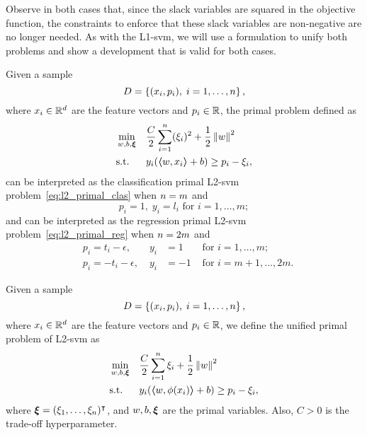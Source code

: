 %
Observe in both cases that, since the slack variables are squared in the objective function, the constraints to enforce that these slack variables are non-negative are no longer needed.
As with the L1-\acrshort{svm}, we will use a formulation to unify both problems and show a development that is valid for both cases. 
%
%
\begin{lemma}
    Given a sample
    $$ D = \left\{(x_i, p_i), \; i=1, \ldots, n\right\} ,$$
    where $x_i \in \mathbb{R}^d$ are the feature vectors and $p_i \in \mathbb{R}$, 
    the primal problem defined as
    \begin{equation}
        \nonumber
        \begin{aligned}
            &\min_{w, b, \bm{\xi}} & & \frac{C}{2} \sum_{i=1}^n (\xi_i)^2 + \frac{1}{2} \left\lVert w\right\rVert^2 \\
            & \text{s.t.} & & y_i (\bm{\left\langle} w, x_i \bm{\right\rangle} + b) \geq p_i - \xi_i ,     
        \end{aligned}  
    \end{equation}
    can be interpreted as the classification primal L2-\acrshort{svm} problem~\eqref{eq:l2_primal_clas} when $n=m$ and
    $$ p_i = 1,\; y_i = l_i \text{ for } i=1, \ldots, m ;$$
    and can be interpreted as the regression primal L2-\acrshort{svm} problem~\eqref{eq:l2_primal_reg} when $n = 2 m$ and
    \begin{equation}
        \nonumber
        \begin{aligned}
            & p_i = t_i - \epsilon ,\; &y_i &= 1 &\text{ for } i=1, \ldots, m ; \\
            & p_i = -t_i - \epsilon ,\; &y_i &= -1 &\text{ for } i=m+1, \ldots, 2m .
        \end{aligned}
    \end{equation}
\end{lemma}
%
\begin{definition}
    Given a sample
    $$ D = \left\{(x_i, p_i), \; i=1, \ldots, n\right\} ,$$
    where $x_i \in \mathbb{R}^d$ are the feature vectors and $p_i \in \mathbb{R}$, 
    we define the unified primal problem of L2-\acrshort{svm} as
    \begin{equation}
        \label{eq:l2_primal}
        \begin{aligned}
            &\min_{w, b, \fv{\xi}} & & \frac{C}{2} \sum_{i=1}^\nsamples \xi_i + \frac{1}{2} \norm{w}^2 \\
            & \text{s.t.} & & y_i (\dotp{w}{\phi(x_i)} + b) \geq p_i - \xi_i ,      
        \end{aligned}  
    \end{equation}
    where $\bm{\xi} = (\xi_1, \ldots, \xi_n)^\intercal$, and $w, b, \bm{\xi}$ are the primal variables. Also, $C > 0$ is the trade-off hyperparameter.
\end{definition}
